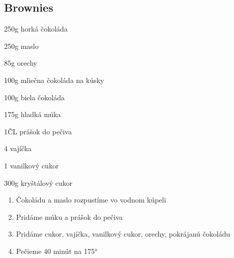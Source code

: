 \setcounter{step}{0}
\subsection{Brownies}

\begin{ingredient}
\def\portions{4}%


\begin{main}
	\item 250g horká čokoláda
	\item 250g maslo
	\item 85g orechy
	\item 100g mliečna čokoláda na kúsky
	\item 100g biela čokoláda
	\item 175g hladká múka
	\item 1ČL prášok do pečiva
	\item 4 vajíčka
	\item 1 vanilkový cukor
	\item 300g kryštálový cukor
\end{main}
\end{ingredient}
\begin{recipe}

\begin{enumerate}

\item{Čokoládu a maslo rozpustíme vo vodnom kúpeli}
\item{Pridáme múku a prášok do pečiva}
\item{Pridáme cukor, vajíčka, vanilkový cukor, orechy, pokrájanú čokoládu}	
\item{Pečieme 40 minút na 175°}

\end{enumerate}
\end{recipe}

\begin{notes}

\end{notes}
\clearpage	